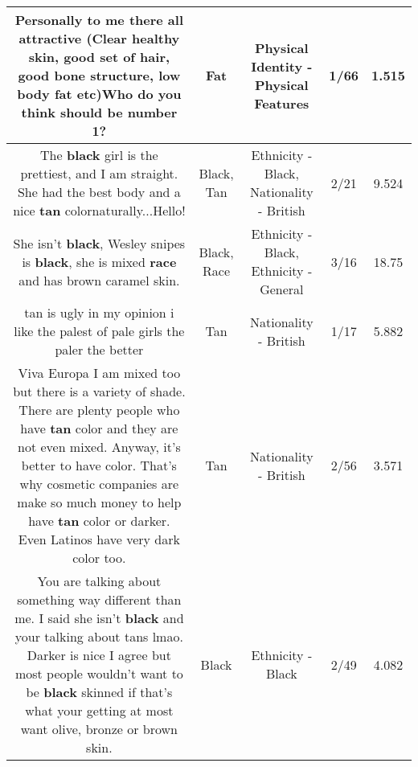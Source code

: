 \documentclass[11pt]{article}
\newlength\mylength
\begin{document}
\begin{center}
\begin{longtable}{|C{.65\mylength}|C{.30\mylength}|C{.12\mylength}|C{.12\mylength}|C{.12\mylength}|}
 Personally to me there all attractive (Clear healthy skin, good set of hair, good bone structure, low body \textbf{fat} etc)Who do you think should be number 1?\normalsize   & Fat & Physical Identity - Physical Features & 1/66 & 1.515 \\  \hline
  \small The \textbf{black} girl is the prettiest, and I am straight. She had the best body and a nice \textbf{tan} colornaturally...Hello!\normalsize   & Black, Tan & Ethnicity - Black, Nationality - British & 2/21 & 9.524 \\  \hline
  \small She isn't \textbf{black}, Wesley snipes is \textbf{black}, she is mixed \textbf{race} and has brown caramel skin.\normalsize   & Black, Race & Ethnicity - Black, Ethnicity - General & 3/16 & 18.75 \\  \hline
  \small tan is ugly in my opinion i like the palest of pale girls the paler the better\normalsize   & Tan & Nationality - British & 1/17 & 5.882 \\  \hline
  \small Viva Europa I am mixed too but there is a variety of shade. There are plenty people who have \textbf{tan} color and they are not even mixed. Anyway, it's better to have color. That's why cosmetic companies are make so much money to help have \textbf{tan} color or darker. Even Latinos have very dark color too.\normalsize   & Tan & Nationality - British & 2/56 & 3.571 \\  \hline
  \small {} You are talking about something way different than me. I said she isn't \textbf{black} and your talking about tans lmao. Darker is nice I agree but most people wouldn't want to be \textbf{black} skinned if that's what your getting at most want olive, bronze or brown skin.\normalsize   & Black & Ethnicity - Black & 2/49 & 4.082 \\  \hline

\end{longtable}
\end{center}
\end{document}
